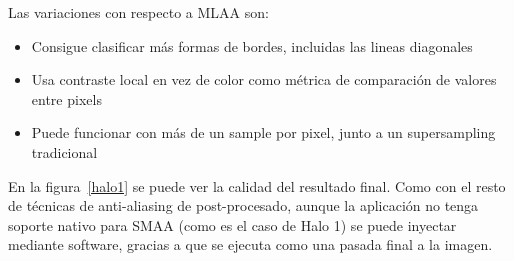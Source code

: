 \documentclass[withindex, glossary]{cam-thesis}
\begin{document}
Las variaciones con respecto a MLAA son:

\begin{itemize}
    \item Consigue clasificar más formas de bordes, incluidas las lineas diagonales
    \item Usa contraste local en vez de color como métrica de comparación de valores entre pixels
    \item Puede funcionar con más de un sample por pixel, junto a un supersampling tradicional
\end{itemize}

En la figura~\ref{halo1} se puede ver la calidad del resultado final. Como con el resto de técnicas de anti-aliasing de post-procesado, aunque la aplicación no tenga soporte nativo para SMAA (como es el caso de Halo 1) se puede inyectar mediante software, gracias a que se ejecuta como una pasada final a la imagen.
\end{document}
